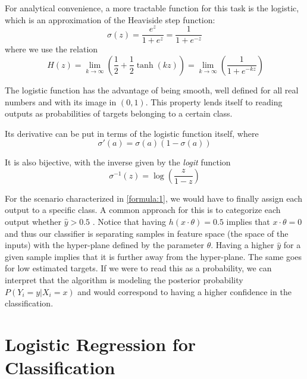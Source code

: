 For analytical convenience, a more tractable function for this task is the logistic, which is an approximation of the Heaviside step function:
\begin{equation}
\sigma(z) = \frac{e^{z}}{1 + e^{z}} = \frac{1}{1 + e^{-z}}
\label{eq:logisticFunction}
\end{equation}
where we use the relation
\begin{equation}
 \ H(z) = \lim_{k \to \infty} \left(\frac{1}{2} + \frac{1}{2}\tanh(kz) \right) = \lim_{k \to \infty} \left(\frac{1}{1+e^{-kz}} \right)
\end{equation}

The logistic function has the advantage of being smooth, well defined for all real numbers and with its image in $(0,1)$.
This property lends itself to reading outputs as probabilities of targets belonging to a certain class.

Its derivative can be put in terms of the logistic function itself, where
\begin{equation}
\sigma '(a) = \sigma(a)( 1 - \sigma(a) )
\label{eq:derivativeLogisticFunction}
\end{equation}

It is also bijective, with the inverse given by the \textit{logit} function
\begin{equation}
\sigma^{-1}(z) = \log \left( \frac{z}{1 - z} \right)
\label{eq:logitFunction}
\end{equation}

For the scenario characterized in \cref{formula:1}, we would have to finally assign each output to a specific class.
A common approach for this is to categorize each output whether $\hat{y} > 0.5$ \label{formula:logitThreshold}.
Notice that having $h(x \cdot \theta) = 0.5$ implies that $x \cdot \theta = 0$ and thus our classifier is separating samples in feature space (the space of the inputs) with the hyper-plane defined by the parameter $\theta$.
Having a higher $\hat{y}$ for a given sample implies that it is further away from the hyper-plane.
The same goes for low estimated targets.
If we were to read this as a probability, we can interpret that the algorithm is modeling the posterior probability $P(Y_i = y | X_i = x)$ and would correspond to having a higher confidence in the classification.




\section{Logistic Regression for Classification}\label{section-logisticRegression}


